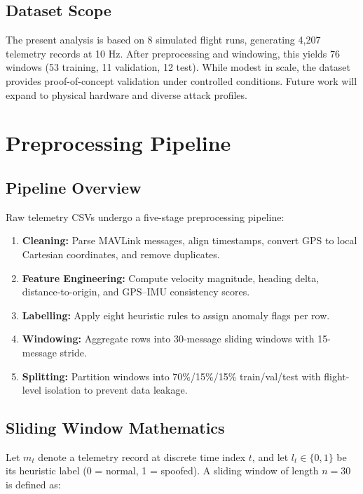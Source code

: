 \documentclass[11pt,a4paper]{article}
\begin{document}
\subsection{Dataset Scope}

The present analysis is based on 8 simulated flight runs, generating 4,207 telemetry records at 10 Hz. After preprocessing and windowing, this yields 76 windows (53 training, 11 validation, 12 test). While modest in scale, the dataset provides proof-of-concept validation under controlled conditions. Future work will expand to physical hardware and diverse attack profiles.

\section{Preprocessing Pipeline}

\subsection{Pipeline Overview}

Raw telemetry CSVs undergo a five-stage preprocessing pipeline:

\begin{enumerate}
    \item \textbf{Cleaning:} Parse MAVLink messages, align timestamps, convert GPS to local Cartesian coordinates, and remove duplicates.
    \item \textbf{Feature Engineering:} Compute velocity magnitude, heading delta, distance-to-origin, and GPS--IMU consistency scores.
    \item \textbf{Labelling:} Apply eight heuristic rules to assign anomaly flags per row.
    \item \textbf{Windowing:} Aggregate rows into 30-message sliding windows with 15-message stride.
    \item \textbf{Splitting:} Partition windows into 70\%/15\%/15\% train/val/test with flight-level isolation to prevent data leakage.
\end{enumerate}

\subsection{Sliding Window Mathematics}

Let $m_t$ denote a telemetry record at discrete time index $t$, and let $l_t \in \{0, 1\}$ be its heuristic label (0 = normal, 1 = spoofed). A sliding window of length $n = 30$ is defined as:
\end{document}
